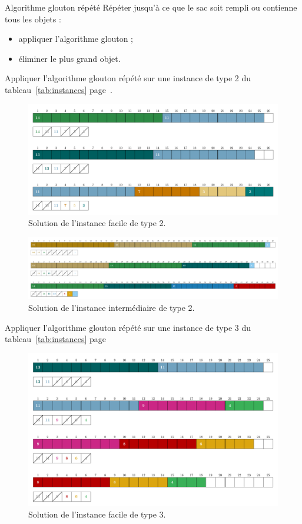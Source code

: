 \documentclass[11pt]{article}
\newcommand{\instance}[1]{instance de type #1 du tableau~\ref{tab:instances} page~\pageref{tab:instances}}
\begin{document}
  \begin{algorithme}{Algorithme glouton répété}
     \label{algo:mtgs}
    Répéter jusqu'à ce que le sac soit rempli ou contienne tous les objets :
    \begin{itemize}
    \item appliquer l'algorithme glouton ;
    \item éliminer le plus grand objet.
    \end{itemize}
  \end{algorithme}

  \begin{exercice}{}
    Appliquer l'algorithme glouton répété sur une \instance{2}.
  \end{exercice}

 \begin{figure}[htbp]
    \centering
    \includegraphics[width=0.6\linewidth]{ex2-6-MTGS.pdf}
    \caption{Solution de l'instance facile de type 2.}
  \end{figure}

  \begin{figure}[htbp]
    \centering
    \includegraphics[width=0.6\linewidth]{ex2-9-MTGS.pdf}
    \caption{Solution de l'instance intermédiaire de type 2.}
  \end{figure}


   \begin{exercice}{}
    \label{ex:ex4}
    Appliquer l'algorithme glouton répété sur une \instance{3}
  \end{exercice}

 \begin{figure}[htbp]
    \centering
    \includegraphics[width=0.6\linewidth]{ex3-6-MTGS.pdf}
    \caption{Solution de l'instance facile de type 3.}
  \end{figure}
\end{document}
